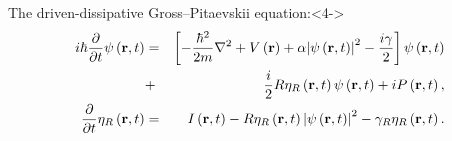 \documentclass[9pt]{beamer}
\begin{document}
\begin{frame}[t]
\begin{block}{The driven-dissipative Gross--Pitaevskii equation:}<4->
\begin{eqnarray}
        i\hbar \frac{\partial}{\partial t} \psi\left(\mathbf{r},t\right) &=& \left[ -\frac{\hbar^2}{2m}\nabla^2 + V\left(\mathbf{r}\right) + \alpha \abs{\psi\left(\mathbf{r},t\right)}^2 -\frac{i \gamma}{2} \right] \psi\left(\mathbf{r},t\right)\nonumber \\ &+& \frac{i}{2}R\eta_R\left(\mathbf{r},t\right) \psi\left(\mathbf{r},t\right)+ iP\left(\mathbf{r},t\right), \nonumber\\
        \frac{\partial}{\partial t} \eta_R\left(\mathbf{r},t\right) &=& I\left(\mathbf{r},t\right) - R \eta_R\left(\mathbf{r},t\right) \abs{\psi\left(\mathbf{r},t\right)}^2 - \gamma_R \eta_R \left(\mathbf{r},t\right).\nonumber
\end{eqnarray}
\end{block}
\end{frame}
\end{document}
